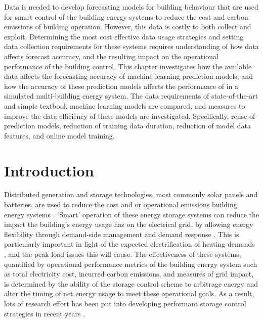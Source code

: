 \vspace{0.5cm}

\noindent
Data is needed to develop forecasting models for building behaviour that are used for smart control of the building energy systems to reduce the cost and carbon emissions of building operation. However, this data is costly to both collect and exploit. Determining the most cost effective data usage strategies and setting data collection requirements for these systems requires understanding of how data affects forecast accuracy, and the resulting impact on the operational performance of the building control. This chapter investigates how the available data affects the forecasting accuracy of machine learning prediction models, and how the accuracy of these prediction models affects the performance of  in a simulated multi-building energy system. The data requirements of state-of-the-art and simple textbook machine learning models are compared, and measures to improve the data efficiency of these models are investigated. Specifically, reuse of prediction models, reduction of training data duration, reduction of model data features, and online model training.


\newpage
\section{Introduction}

Distributed generation and storage technologies, most commonly solar panels and batteries, are used to reduce the cost and or operational emissions building energy systems \citep{aminitoosi2022BuildingDecarbonizationAssessing,oshaughnessey2021DemandSideOpportunityRoles,zhu2023ReviewDistributedEnergy}. `Smart' operation of these energy storage systems can reduce the impact the building's energy usage has on the electrical grid, by allowing energy flexibility through demand-side management and demand response \citep{vazquez-canteli2020MARLISAMultiAgentReinforcement}. This is particularly important in light of the expected electrification of heating demands \citep{leibowicz2018OptimalDecarbonizationPathways}, and the peak load issues this will cause. The effectiveness of these systems, quantified by operational performance metrics of the building energy system such as total electricity cost, incurred carbon emissions, and measures of grid impact, is determined by the ability of the storage control scheme to arbitrage energy and alter the timing of net energy usage to meet these operational goals. As a result, lots of research effort has been put into developing performant storage control strategies in recent years \citep{drgona2020AllYouNeed,wang2020ReinforcementLearningBuilding,kathirgamanathan2021DatadrivenPredictiveControl}.

